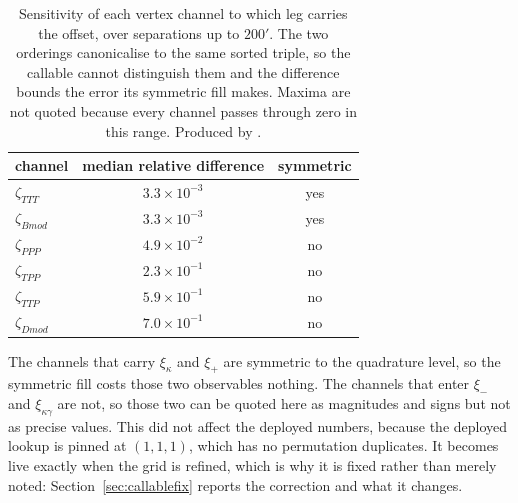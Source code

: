 \begin{table}[h]
\centering
\begin{tabular}{lcc}
\toprule
channel & median relative difference & symmetric \\
\midrule
$\zeta_{TTT}$  & $3.3\times10^{-3}$ & yes \\
$\zeta_{Bmod}$ & $3.3\times10^{-3}$ & yes \\
$\zeta_{PPP}$  & $4.9\times10^{-2}$ & no \\
$\zeta_{TPP}$  & $2.3\times10^{-1}$ & no \\
$\zeta_{TTP}$  & $5.9\times10^{-1}$ & no \\
$\zeta_{Dmod}$ & $7.0\times10^{-1}$ & no \\
\bottomrule
\end{tabular}
\caption{Sensitivity of each vertex channel to which leg carries the
offset, over separations up to $200'$. The two orderings canonicalise to
the same sorted triple, so the callable cannot distinguish them and the
difference bounds the error its symmetric fill makes. Maxima are not quoted
because every channel passes through zero in this range. Produced by
.}
\label{tab:perm}
\end{table}

The channels that carry $\xi_\kappa$ and $\xi_+$ are symmetric to the
quadrature level, so the symmetric fill costs those two observables
nothing. The channels that enter $\xi_-$ and $\xi_{\kappa\gamma}$ are not,
so those two can be quoted here as magnitudes and signs but not as precise
values. This did not affect the deployed numbers, because the deployed
lookup is pinned at $(1,1,1)$, which has no permutation duplicates. It
becomes live exactly when the grid is refined, which is why it is fixed
rather than merely noted: Section~\ref{sec:callablefix} reports the
correction and what it changes.
